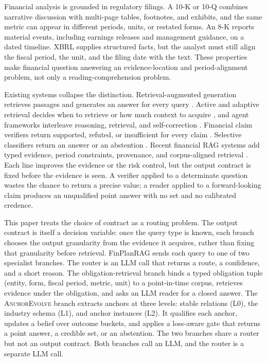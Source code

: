\documentclass[11pt]{article}
\newcommand{\method}{FinPlanRAG}
\newcommand{\anchor}{\textsc{AnchorEvolve}}
\begin{document}
Financial analysis is grounded in regulatory filings. A 10-K or 10-Q combines narrative discussion with multi-page tables, footnotes, and exhibits, and the same metric can appear in different periods, units, or restated forms. An 8-K reports material events, including earnings releases and management guidance, on a dated timeline. XBRL supplies structured facts, but the analyst must still align the fiscal period, the unit, and the filing date with the text. These properties make financial question answering an evidence-location and period-alignment problem, not only a reading-comprehension problem.

Existing systems collapse the distinction. Retrieval-augmented generation retrieves passages and generates an answer for every query \citep{lewis2020rag}. Active and adaptive retrieval decides when to retrieve or how much context to acquire \citep{jiang2023flare,jeong2024adaptiverag}, and agent frameworks interleave reasoning, retrieval, and self-correction \citep{yao2023react,shinn2023reflexion}. Financial claim verifiers return supported, refuted, or insufficient for every claim \citep{zhao2024findver,rangapur2025finfact}. Selective classifiers return an answer or an abstention \citep{chow1970optimum,geifman2017selective}. Recent financial RAG systems add typed evidence, period constraints, provenance, and corpus-aligned retrieval \citep{mansouri2026finrank,jiang2026finrate,chen2026hcrag,chi2026finsagent,zhou2026fincards}. Each line improves the evidence or the risk control, but the output contract is fixed before the evidence is seen. A verifier applied to a determinate question wastes the chance to return a precise value; a reader applied to a forward-looking claim produces an unqualified point answer with no set and no calibrated credence.

This paper treats the choice of contract as a routing problem. The output contract is itself a decision variable: once the query type is known, each branch chooses the output granularity from the evidence it acquires, rather than fixing that granularity before retrieval. \method{} sends each query to one of two specialist branches. The router is an LLM call that returns a route, a confidence, and a short reason. The obligation-retrieval branch binds a typed obligation tuple (entity, form, fiscal period, metric, unit) to a point-in-time corpus, retrieves evidence under the obligation, and asks an LLM reader for a closed answer. The \anchor{} branch extracts anchors at three levels: stable relations (L0), the industry schema (L1), and anchor instances (L2). It qualifies each anchor, updates a belief over outcome buckets, and applies a loss-aware gate that returns a point answer, a credible set, or an abstention. The two branches share a router but not an output contract. Both branches call an LLM, and the router is a separate LLM call.
\end{document}
